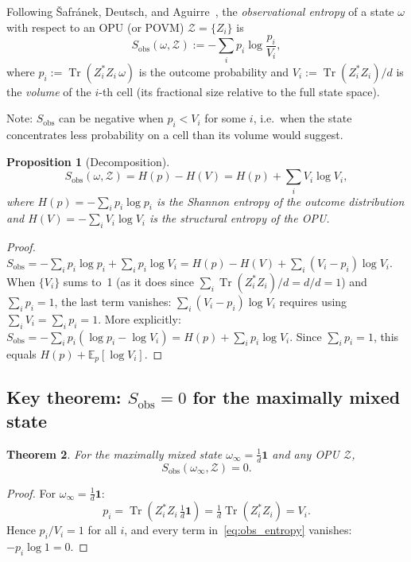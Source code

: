 \documentclass[12pt,a4paper]{article}
\newtheorem{theorem}{Theorem}[section]
\newtheorem{proposition}[theorem]{Proposition}
\DeclareMathOperator{\Tr}{Tr}
\begin{document}
Following \v{S}afr\'anek, Deutsch, and Aguirre~\cite{safranek2019}, the
\emph{observational entropy} of a state $\omega$ with respect to an OPU (or
POVM) $\mathcal{Z}=\{Z_i\}$ is
\begin{equation}\label{eq:obs_entropy}
  S_{\mathrm{obs}}(\omega,\mathcal{Z})
  := -\sum_i p_i \log\frac{p_i}{V_i},
\end{equation}
where $p_i := \Tr(Z_i^* Z_i\,\omega)$ is the outcome probability and
$V_i := \Tr(Z_i^* Z_i)/d$ is the \emph{volume} of the $i$-th cell
(its fractional size relative to the full state space).

Note: $S_{\mathrm{obs}}$ can be negative when $p_i < V_i$ for some $i$, i.e.\ when
the state concentrates less probability on a cell than its volume would suggest.

\begin{proposition}[Decomposition]\label{prop:obs_decomp}
\begin{equation}\label{eq:obs_decomp}
  S_{\mathrm{obs}}(\omega,\mathcal{Z})
  = H(p) - H(V)
  = H(p) + \sum_i V_i\log V_i,
\end{equation}
where $H(p)=-\sum_i p_i\log p_i$ is the Shannon entropy of the outcome
distribution and $H(V)=-\sum_i V_i\log V_i$ is the \emph{structural entropy}
of the OPU.
\end{proposition}
\begin{proof}
$S_{\mathrm{obs}} = -\sum_i p_i\log p_i + \sum_i p_i\log V_i
= H(p) - H(V) + \sum_i(V_i-p_i)\log V_i$.
When $\{V_i\}$ sums to~1 (as it does since $\sum_i\Tr(Z_i^*Z_i)/d = d/d=1$)
and $\sum_i p_i=1$, the last term vanishes:
$\sum_i(V_i-p_i)\log V_i$
requires using $\sum_i V_i = \sum_i p_i = 1$.
More explicitly: $S_{\mathrm{obs}} = -\sum_i p_i(\log p_i - \log V_i) = H(p) + \sum_i p_i\log V_i$.
Since $\sum_i p_i = 1$, this equals $H(p) + \mathbb{E}_p[\log V_i]$.
\end{proof}

\subsection{Key theorem: \texorpdfstring{$S_{\mathrm{obs}}=0$}{Sobs = 0} for the maximally mixed state}

\begin{theorem}\label{thm:obs_zero}
For the maximally mixed state $\omega_\infty = \frac{1}{d}\mathbf{1}$ and any
OPU $\mathcal{Z}$,
\begin{equation}
  S_{\mathrm{obs}}\!\left(\omega_\infty,\mathcal{Z}\right) = 0.
\end{equation}
\end{theorem}
\begin{proof}
For $\omega_\infty = \frac{1}{d}\mathbf{1}$:
\[
  p_i = \Tr(Z_i^*Z_i\,\tfrac{1}{d}\mathbf{1})
      = \tfrac{1}{d}\Tr(Z_i^*Z_i)
      = V_i.
\]
Hence $p_i/V_i=1$ for all $i$, and every term in~\eqref{eq:obs_entropy}
vanishes: $-p_i\log 1 = 0$.
\end{proof}
\end{document}
